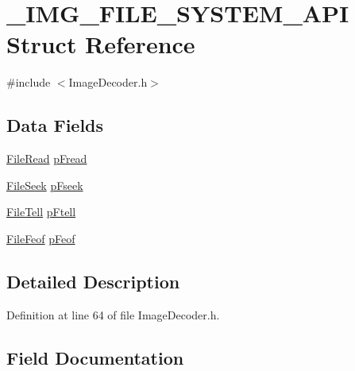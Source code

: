 \hypertarget{struct___i_m_g___f_i_l_e___s_y_s_t_e_m___a_p_i}{}\section{\+\_\+\+I\+M\+G\+\_\+\+F\+I\+L\+E\+\_\+\+S\+Y\+S\+T\+E\+M\+\_\+\+A\+P\+I Struct Reference}
\label{struct___i_m_g___f_i_l_e___s_y_s_t_e_m___a_p_i}


{\ttfamily \#include $<$Image\+Decoder.\+h$>$}

\subsection*{Data Fields}
\begin{DoxyCompactItemize}
\item 
\hyperlink{_file_system_8c_a6792e5fd19633f0b096936a3e5db5ac1}{File\+Read} \hyperlink{struct___i_m_g___f_i_l_e___s_y_s_t_e_m___a_p_i_a641a41f2af54d67fe347bf4dc79897d2}{p\+Fread}
\item 
\hyperlink{_file_system_8c_a3125bcf58f339ee61661f4df158c94f4}{File\+Seek} \hyperlink{struct___i_m_g___f_i_l_e___s_y_s_t_e_m___a_p_i_a86f29fb273a57aa20930d100e107e077}{p\+Fseek}
\item 
\hyperlink{_file_system_8c_a67c08f8987e9cebfb28536f02d7dcc65}{File\+Tell} \hyperlink{struct___i_m_g___f_i_l_e___s_y_s_t_e_m___a_p_i_a3943837ac285894b006a68973c748cdc}{p\+Ftell}
\item 
\hyperlink{_image_decoder_8h_a41bc002da516fbca496a45128bdba770}{File\+Feof} \hyperlink{struct___i_m_g___f_i_l_e___s_y_s_t_e_m___a_p_i_aa3b4d801ba75d0261e8dc82f9f191a15}{p\+Feof}
\end{DoxyCompactItemize}


\subsection{Detailed Description}


Definition at line 64 of file Image\+Decoder.\+h.



\subsection{Field Documentation}
\hypertarget{struct___i_m_g___f_i_l_e___s_y_s_t_e_m___a_p_i_aa3b4d801ba75d0261e8dc82f9f191a15}{}
